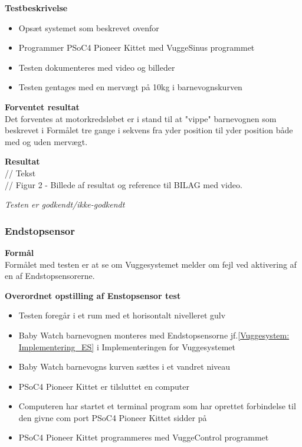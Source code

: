 \textbf{Testbeskrivelse}
\begin{itemize}
	\item Opsæt systemet som beskrevet ovenfor
	\item Programmer PSoC4 Pioneer Kittet med VuggeSinus programmet
	\item Testen dokumenteres med video og billeder
	\item Testen gentages med en mervægt på 10kg i barnevognskurven
\end{itemize}

\textbf{Forventet resultat} \\
Det forventes at motorkredsløbet er i stand til at "vippe" barnevognen som beskrevet i Formålet tre gange i sekvens fra yder position til yder position både med og uden mervægt.

\textbf{Resultat} \\
// Tekst \\

// Figur 2 - Billede af resultat og reference til BILAG med video.

\textit{Testen er godkendt/ikke-godkendt}



\subsubsection{Endstopsensor}
\textbf{Formål} \\
Formålet med testen er at se om Vuggesystemet melder om fejl ved aktivering af en af Endstopsensorerne.

\textbf{Overordnet opstilling af Enstopsensor test}

\begin{itemize}
	\item Testen foregår i et rum med et horisontalt nivelleret gulv
	\item Baby Watch barnevognen monteres med Endstopsensorne jf.\ref{Vuggesystem: Implementering_ES} i Implementeringen for Vuggesystemet 
	\item Baby Watch barnevogns kurven sættes i et vandret niveau
	\item PSoC4 Pioneer Kittet er tilsluttet en computer
	\item Computeren har startet et terminal program som har oprettet forbindelse til den givne com port PSoC4 Pioneer Kittet sidder på
	\item PSoC4 Pioneer Kittet programmeres med VuggeControl programmet
\end{itemize}

